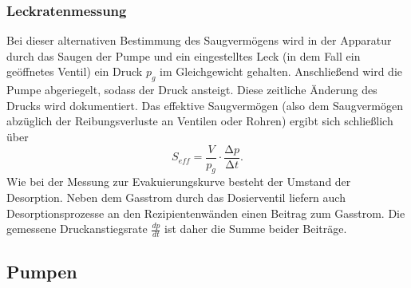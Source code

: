\subsubsection{Leckratenmessung}
Bei dieser alternativen Bestimmung des Saugvermögens wird in der Apparatur 
durch das Saugen der Pumpe und ein eingestelltes Leck (in dem Fall ein geöffnetes
Ventil) ein Druck $p_g$ im Gleichgewicht gehalten. 
Anschließend wird die Pumpe abgeriegelt, sodass der Druck ansteigt. Diese 
zeitliche Änderung des Drucks wird dokumentiert. Das effektive Saugvermögen 
(also dem Saugvermögen abzüglich der Reibungsverluste an Ventilen oder Rohren)
ergibt sich schließlich über 
\begin{equation}
    \label{eqn:5}
    S_{eff} = \frac{V}{p_g} \cdot \frac{\increment p}{\increment t}.
\end{equation}
Wie bei der Messung zur Evakuierungskurve besteht der Umstand der Desorption.
Neben dem Gasstrom durch das Dosierventil liefern auch Desorptionsprozesse an 
den Rezipientenwänden einen Beitrag zum Gasstrom. Die gemessene Druckanstiegsrate
$\frac{dp}{dt}$ ist daher die Summe beider Beiträge. 


\subsection{Pumpen}
